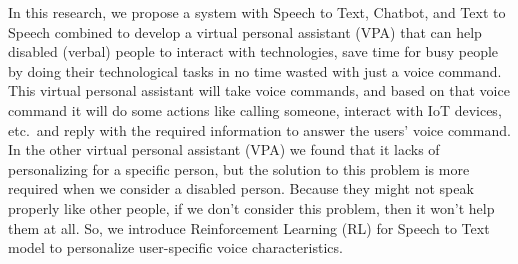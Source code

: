 In this research, we propose a system with Speech to Text, Chatbot, and Text to Speech combined to develop a virtual personal assistant (VPA) that can help disabled (verbal) people to interact with technologies, save time for busy people by doing their technological tasks in no time wasted with just a voice command.
This virtual personal assistant will take voice commands, and based on that voice command it will do some actions like calling someone, interact with IoT devices, etc.\ and reply with the required information to answer the users' voice command.
In the other virtual personal assistant (VPA) we found that it lacks of personalizing for a specific person, but the solution to this problem is more required when we consider a disabled person.
Because they might not speak properly like other people, if we don't consider this problem, then it won't help them at all.
So, we introduce Reinforcement Learning (RL) for Speech to Text model to personalize user-specific voice characteristics.

